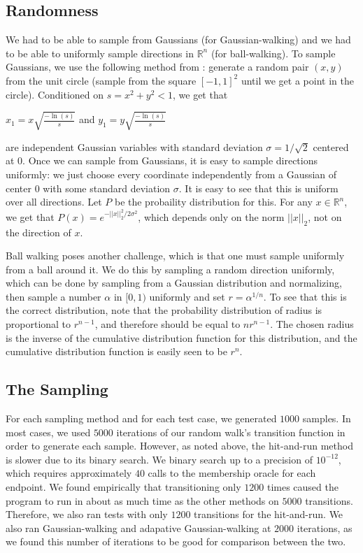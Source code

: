 \documentclass[11pt]{article}
\begin{document}
\subsection{Randomness}

We had to be able to sample from Gaussians (for Gaussian-walking) and we had to be able to uniformly sample directions in $\mathbb{R}^n$ (for ball-walking). To sample Gaussians, we use the following method from \cite{Marsaglia}: generate a random pair $(x,y)$ from the unit circle (sample from the square $[-1,1]^2$ until we get a point in the circle). Conditioned on $s = x^2 + y^2 < 1$, we get that
\begin{center}
$\displaystyle x_1 = x\sqrt{\frac{-\ln(s)}{s}}$ and $\displaystyle y_1 = y\sqrt{\frac{-\ln(s)}{s}}$
\end{center}
are independent Gaussian variables with standard deviation $\sigma = 1/\sqrt{2}$ centered at $0$. Once we can sample from Gaussians, it is easy to sample directions uniformly: we just choose every coordinate independently from a Gaussian of center $0$ with some standard deviation $\sigma$. It is easy to see that this is uniform over all directions. Let $P$ be the probaility distribution for this. For any $x\in\mathbb{R}^n$, we get that $P(x) = e^{-||x||_2^2 / 2\sigma^2}$, which depends only on the norm $||x||_2$, not on the direction of $x$.

Ball walking poses another challenge, which is that one must sample uniformly from a ball around it. We do this by sampling a random direction uniformly, which can be done by sampling from a Gaussian distribution and normalizing, then sample a number $\alpha$ in $[0,1)$ uniformly and set $r = \alpha^{1/n}$. To see that this is the correct distribution, note that the probability distribution of radius is proportional to $r^{n-1}$, and therefore should be equal to $nr^{n-1}$. The chosen radius is the inverse of the cumulative distribution function for this distribution, and the cumulative distribution function is easily seen to be $r^n$.

\subsection{The Sampling}

For each sampling method and for each test case, we generated $1000$ samples. In most cases, we used $5000$ iterations of our random walk's transition function in order to generate each sample. However, as noted above, the hit-and-run method is slower due to its binary search. We binary search up to a precision of $10^{-12}$, which requires approximately $40$ calls to the membership oracle for each endpoint. We found empirically that transitioning only $1200$ times caused the program to run in about as much time as the other methods on $5000$ transitions. Therefore, we also ran tests with only $1200$ transitions for the hit-and-run. We also ran Gaussian-walking and adapative Gaussian-walking at $2000$ iterations, as we found this number of iterations to be good for comparison between the two.
\end{document}
